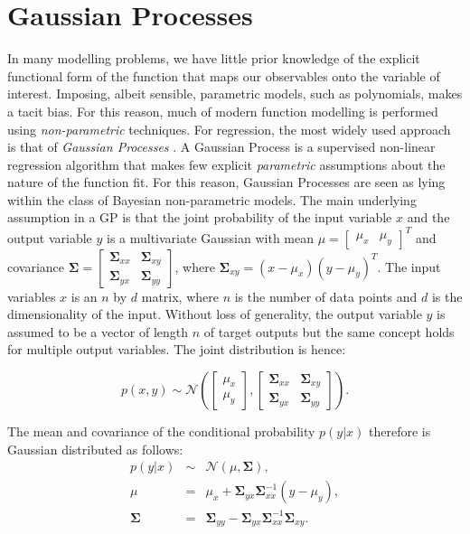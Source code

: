 \documentclass[useAMS,usenatbib,fleqn]{mn2e}
\begin{document}
\section{Gaussian Processes}
\label{sec-gaussian-process}
In many modelling problems, we have little prior knowledge of the explicit functional form of the function that maps our observables onto the variable of interest. Imposing, albeit sensible, parametric models, such as polynomials, makes a tacit bias. For this reason, much of modern function modelling is performed using \emph{non-parametric} techniques. For regression, the most widely used approach is that of \emph{Gaussian Processes} \citep{rasmussen2006gaussian}.
A Gaussian Process is a supervised non-linear regression algorithm that makes few explicit \emph{parametric} assumptions about the nature of the function fit. For this reason, Gaussian Processes are seen as lying within the class of Bayesian non-parametric models. The main underlying assumption in a GP is that the joint probability of the input variable $x$ and the output variable $y$ is a multivariate Gaussian with mean $\mu=\begin{bmatrix} \mu_{x} & \mu_{y}\end{bmatrix}^{T}$ and covariance $\mathbf\Sigma=\begin{bmatrix}\mathbf\Sigma_{xx} & \mathbf\Sigma_{xy} \\ \mathbf\Sigma_{yx} & \mathbf\Sigma_{yy} \end{bmatrix}$, where $\mathbf\Sigma_{xy}=(x-\mu_{x})(y-\mu_{y})^{T}$. The input variables $x$ is an $n$ by $d$ matrix, where $n$ is the number of data points and $d$ is the dimensionality of the input. Without loss of generality, the output variable $y$ is assumed to be a vector of length $n$ of target outputs but the same concept holds for multiple output variables. The joint distribution is hence:

\begin{equation}
p\left ( x,y\right) \sim \mathcal{N} \left ( \begin{bmatrix}\mu_{x}\\\mu_{y} \end{bmatrix}, \begin{bmatrix}\mathbf\Sigma_{xx} & \mathbf\Sigma_{xy}\\\mathbf\Sigma_{yx} & \mathbf\Sigma_{yy} \end{bmatrix}\right ).
\end{equation}

The mean and covariance of the conditional probability $p(y|x)$ therefore is Gaussian distributed as follows:
\begin{equation}
\begin{array}{rcl}
p(y|x)		&	\sim		&	\mathcal{N} \left ( \mu, \mathbf\Sigma \right ),\\
\mu			&	=		&	\mu_{x}+\mathbf\Sigma_{yx}\mathbf\Sigma_{xx}^{-1}\left ( y-\mu_{y}\right ),\\
\mathbf\Sigma		&	=		&	\mathbf\Sigma_{yy}-\mathbf\Sigma_{yx}\mathbf\Sigma_{xx}^{-1}\mathbf\Sigma_{xy}.
\end{array}
\end{equation}
\end{document}
